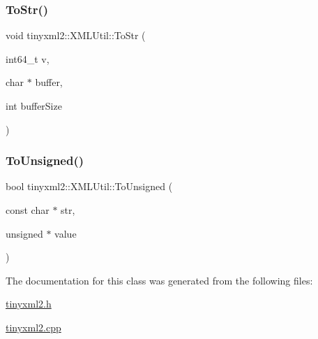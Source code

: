 \mbox{\label{classtinyxml2_1_1_x_m_l_util_a26a8cb5b833ad587b3af39469c8111de}} 
\subsubsection{\texorpdfstring{To\+Str()}{ToStr()}\hspace{0.1cm}{\footnotesize\ttfamily [6/6]}}
{\footnotesize\ttfamily void tinyxml2\+::\+X\+M\+L\+Util\+::\+To\+Str (\begin{DoxyParamCaption}\item[{int64\+\_\+t}]{v,  }\item[{char $\ast$}]{buffer,  }\item[{int}]{buffer\+Size }\end{DoxyParamCaption})\hspace{0.3cm}{\ttfamily [static]}}

\mbox{\label{classtinyxml2_1_1_x_m_l_util_a210c8637d5eb4ce3d4625294af0efc2f}} 
\subsubsection{\texorpdfstring{To\+Unsigned()}{ToUnsigned()}}
{\footnotesize\ttfamily bool tinyxml2\+::\+X\+M\+L\+Util\+::\+To\+Unsigned (\begin{DoxyParamCaption}\item[{const char $\ast$}]{str,  }\item[{unsigned $\ast$}]{value }\end{DoxyParamCaption})\hspace{0.3cm}{\ttfamily [static]}}



The documentation for this class was generated from the following files\+:\begin{DoxyCompactItemize}
\item 
\hyperlink{tinyxml2_8h}{tinyxml2.\+h}\item 
\hyperlink{tinyxml2_8cpp}{tinyxml2.\+cpp}\end{DoxyCompactItemize}

